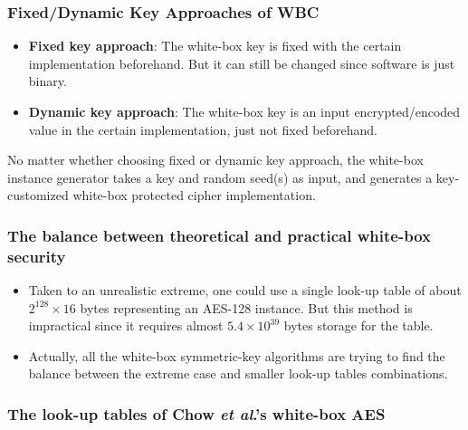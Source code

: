 \documentclass{beamer}
\begin{document}
\frame
{
\frametitle{Fixed/Dynamic Key Approaches of WBC}
\begin{itemize}
\item \textbf{Fixed key approach}: The white-box key is fixed with the certain implementation beforehand. \textcolor[rgb]{1.00,0.00,0.00}{But it can still be changed since software is just binary.}

\item \textbf{Dynamic key approach}: The white-box key is an input encrypted/encoded value in the certain implementation, just not fixed beforehand.
\end{itemize}

No matter whether choosing fixed or dynamic key approach, the white-box instance generator takes a key and random seed(s) as input, and generates a key-customized white-box protected cipher implementation.
}

\frame
{
\frametitle{The balance between theoretical and practical white-box security}
\begin{itemize}
\item Taken to an unrealistic extreme, one could use a single look-up table of about $2^{128}\times 16$ bytes representing an AES-128 instance. But this method is impractical since it requires almost $5.4 \times 10^{39}$ bytes storage for the table.

\item Actually, all the white-box symmetric-key algorithms are trying to \textcolor[rgb]{1.00,0.00,0.00}{find the balance between the extreme case and smaller look-up tables combinations}.
\end{itemize}
}

\frame
{
\frametitle{The look-up tables of Chow \textit{et al}.'s white-box AES}
\begin{center}
\end{center}
}
\end{document}
